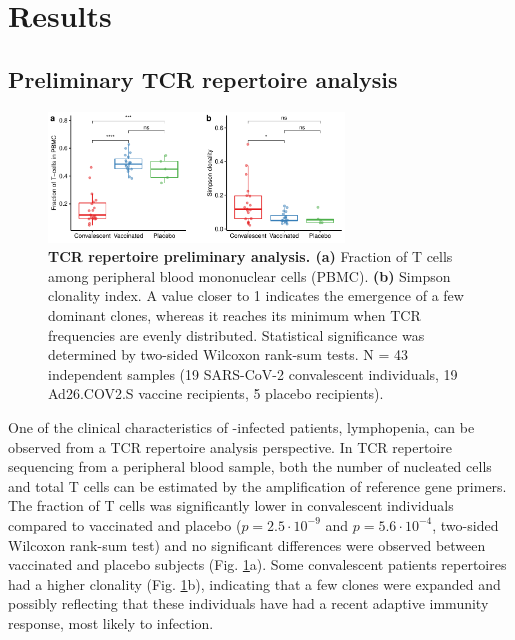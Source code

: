 \chapter*{Results}
\label{cap:res}

\section*{Preliminary TCR repertoire analysis}


\begin{figure}[!t]
	\centering
	\includegraphics[width=0.7\textwidth,keepaspectratio]{figures/fig1.pdf}
	\caption{\textbf{TCR repertoire preliminary analysis. (a)} Fraction of T cells among peripheral blood mononuclear cells (PBMC). \textbf{(b)} Simpson clonality index. A value closer to 1 indicates the emergence of a few dominant clones, whereas it reaches its minimum when TCR frequencies are evenly distributed. Statistical significance was determined by two-sided Wilcoxon rank-sum tests. N = 43 independent samples (19 SARS-CoV-2 convalescent individuals, 19 Ad26.COV2.S vaccine recipients, 5 placebo recipients).}
	\label{fig:lymphopenia}
\end{figure}


One of the clinical characteristics of \covid-infected patients, lymphopenia, can be observed from a TCR repertoire analysis perspective. In TCR repertoire sequencing from a peripheral blood sample, both the number of nucleated cells and total T cells can be estimated by the amplification of reference gene primers. The fraction of T cells was significantly lower in convalescent individuals compared to vaccinated and placebo ($p = 2.5\cdot10^{-9}$ and $p = 5.6\cdot10^{-4}$, two-sided Wilcoxon rank-sum test) and no significant differences were observed between vaccinated and placebo subjects (Fig. \ref{fig:lymphopenia}a). Some convalescent patients \TCRB{} repertoires had a higher clonality (Fig. \ref{fig:lymphopenia}b), indicating that a few clones were expanded and possibly reflecting that these individuals have had a recent adaptive immunity response, most likely to \covid{} infection.

